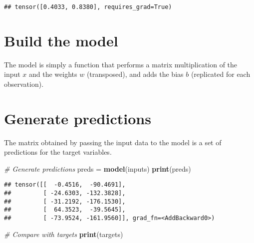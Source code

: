 \documentclass[]{book}
\newenvironment{Shaded}{\begin{snugshade}}{\end{snugshade}}
\newcommand{\CommentTok}[1]{\textcolor[rgb]{0.56,0.35,0.01}{\textit{#1}}}
\newcommand{\ControlFlowTok}[1]{\textcolor[rgb]{0.13,0.29,0.53}{\textbf{#1}}}
\newcommand{\KeywordTok}[1]{\textcolor[rgb]{0.13,0.29,0.53}{\textbf{#1}}}
\newcommand{\NormalTok}[1]{#1}
\newcommand{\OperatorTok}[1]{\textcolor[rgb]{0.81,0.36,0.00}{\textbf{#1}}}
\newcommand{\StringTok}[1]{\textcolor[rgb]{0.31,0.60,0.02}{#1}}
\begin{document}
\begin{verbatim}
## tensor([0.4033, 0.8380], requires_grad=True)
\end{verbatim}

\hypertarget{build-the-model}{%
\section{Build the model}\label{build-the-model}}

The model is simply a function that performs a matrix multiplication of the input \(x\) and the weights \(w\) (transposed), and adds the bias \(b\) (replicated for each observation).

\begin{Shaded}
\end{Shaded}

\hypertarget{generate-predictions}{%
\section{Generate predictions}\label{generate-predictions}}

The matrix obtained by passing the input data to the model is a set of predictions for the target variables.

\begin{Shaded}
\begin{Highlighting}[]
\CommentTok{# Generate predictions}
\NormalTok{preds =}\StringTok{ }\KeywordTok{model}\NormalTok{(inputs)}
\KeywordTok{print}\NormalTok{(preds)}
\end{Highlighting}
\end{Shaded}

\begin{verbatim}
## tensor([[  -0.4516,  -90.4691],
##         [ -24.6303, -132.3828],
##         [ -31.2192, -176.1530],
##         [  64.3523,  -39.5645],
##         [ -73.9524, -161.9560]], grad_fn=<AddBackward0>)
\end{verbatim}

\begin{Shaded}
\begin{Highlighting}[]
\CommentTok{# Compare with targets}
\KeywordTok{print}\NormalTok{(targets)}
\end{Highlighting}
\end{Shaded}
\end{document}
